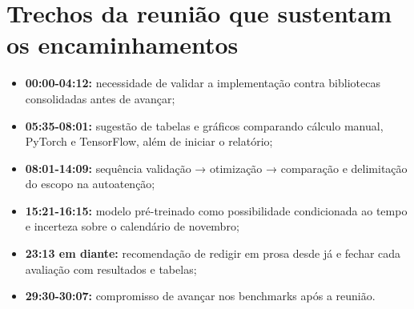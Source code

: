 \section{Trechos da reunião que sustentam os encaminhamentos}


\begin{itemize}
\item \textbf{00:00-04:12:} necessidade de validar a implementação contra bibliotecas
consolidadas antes de avançar;
\item \textbf{05:35-08:01:} sugestão de tabelas e gráficos comparando cálculo manual,
PyTorch e TensorFlow, além de iniciar o relatório;
\item \textbf{08:01-14:09:} sequência validação → otimização → comparação e delimitação do
escopo na autoatenção;
\item \textbf{15:21-16:15:} modelo pré-treinado como possibilidade condicionada ao tempo e
incerteza sobre o calendário de novembro;
\item \textbf{23:13 em diante:} recomendação de redigir em prosa desde já e fechar cada
avaliação com resultados e tabelas;
\item \textbf{29:30-30:07:} compromisso de avançar nos benchmarks após a reunião.
\end{itemize}
